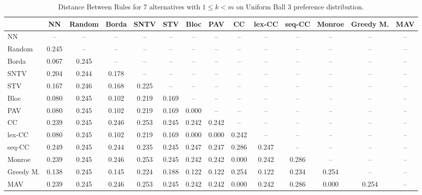 
\begin{table*}
\centering
\begin{tabular}{lccccccccccccc}
\toprule
 & NN & Random & Borda & SNTV & STV & Bloc & PAV & CC & lex-CC & seq-CC & Monroe & Greedy M. & MAV \\
\midrule
NN & -- & -- & -- & -- & -- & -- & -- & -- & -- & -- & -- & -- & -- \\
Random & 0.245 & -- & -- & -- & -- & -- & -- & -- & -- & -- & -- & -- & -- \\
Borda & 0.067 & 0.245 & -- & -- & -- & -- & -- & -- & -- & -- & -- & -- & -- \\
SNTV & 0.204 & 0.244 & 0.178 & -- & -- & -- & -- & -- & -- & -- & -- & -- & -- \\
STV & 0.167 & 0.246 & 0.168 & 0.225 & -- & -- & -- & -- & -- & -- & -- & -- & -- \\
Bloc & 0.080 & 0.245 & 0.102 & 0.219 & 0.169 & -- & -- & -- & -- & -- & -- & -- & -- \\
PAV & 0.080 & 0.245 & 0.102 & 0.219 & 0.169 & 0.000 & -- & -- & -- & -- & -- & -- & -- \\
CC & 0.239 & 0.245 & 0.246 & 0.253 & 0.245 & 0.242 & 0.242 & -- & -- & -- & -- & -- & -- \\
lex-CC & 0.080 & 0.245 & 0.102 & 0.219 & 0.169 & 0.000 & 0.000 & 0.242 & -- & -- & -- & -- & -- \\
seq-CC & 0.249 & 0.245 & 0.244 & 0.235 & 0.245 & 0.247 & 0.247 & 0.286 & 0.247 & -- & -- & -- & -- \\
Monroe & 0.239 & 0.245 & 0.246 & 0.253 & 0.245 & 0.242 & 0.242 & 0.000 & 0.242 & 0.286 & -- & -- & -- \\
Greedy M. & 0.138 & 0.245 & 0.145 & 0.224 & 0.188 & 0.122 & 0.122 & 0.254 & 0.122 & 0.234 & 0.254 & -- & -- \\
MAV & 0.239 & 0.245 & 0.246 & 0.253 & 0.245 & 0.242 & 0.242 & 0.000 & 0.242 & 0.286 & 0.000 & 0.254 & -- \\
\bottomrule
\end{tabular}

\caption{Distance Between Rules for 7 alternatives with $1 \leq k < m$ on Uniform Ball 3 preference distribution.}
\end{table*}

